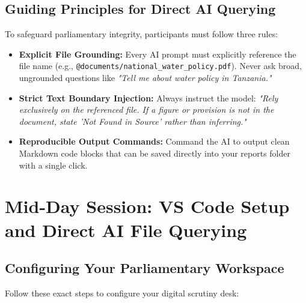 \documentclass[11pt, a4paper]{report}
\begin{document}
\section{Guiding Principles for Direct AI Querying}
To safeguard parliamentary integrity, participants must follow three rules:
\begin{itemize}[label=-]
    \item \textbf{Explicit File Grounding:} Every AI prompt must explicitly reference the file name (e.g., \texttt{@documents/national\_water\_policy.pdf}). Never ask broad, ungrounded questions like \textit{"Tell me about water policy in Tanzania."}
    \item \textbf{Strict Text Boundary Injection:} Always instruct the model: \textit{"Rely exclusively on the referenced file. If a figure or provision is not in the document, state 'Not Found in Source' rather than inferring."}
    \item \textbf{Reproducible Output Commands:} Command the AI to output clean Markdown code blocks that can be saved directly into your reports folder with a single click.
\end{itemize}

\vspace{1.5em}
\noindent{}
\vspace{1.5em}

\newpage

\chapter{Mid-Day Session: VS Code Setup and Direct AI File Querying}

\section{Configuring Your Parliamentary Workspace}
Follow these exact steps to configure your digital scrutiny desk:
\end{document}
